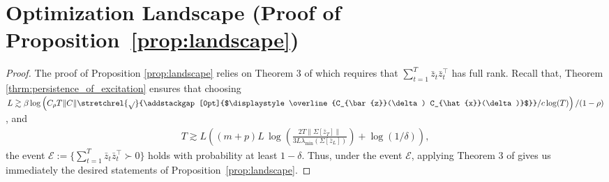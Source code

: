 \documentclass[11pt]{article}
\renewcommand{\cite}{\citep}
\newcommand{\zbar}{\bar{z}}
\newcommand{\xtil}{\hat{x}}
\newcommand{\norm}[1]{\|{#1} \|}
\newcommand{\normbig}[1]{\left\|{#1} \right\|}
\newcommand{\<}{\langle}
\renewcommand{\>}{\rangle}
\numberwithin{equation}{section}
\newcommand\mysqrt[2][0pt]{\stretchrel{\sqrt{}}{\addstackgap%
		[#1]{$\displaystyle\overline{#2}$}}}
\begin{document}
%


\section{Optimization Landscape (Proof of Proposition~\ref{prop:landscape})} \label{app:optim}

\begin{proof}%
    The proof of Proposition \ref{prop:landscape} relies on Theorem 3 of \cite{zhu2020global} which requires that $\sum_{t=1}^T \bar z_t \bar z_t^\top$ %
    has full rank. Recall that, Theorem \ref{thrm:persistence_of_excitation} ensures that choosing $L \gtrsim \beta\log\left(C_\rho T \norm{C}\mysqrt{C_{\zbar}(\delta) C_{\xtil}(\delta)}/c\log(T)\right)/(1-\rho)$, and 
    \begin{align*}
        T \gtrsim L \left((m+p)L \,\log\left(\frac{2T\normbig{\Sigma[\zbar_T]}}{3L \lambda_{\min}\left(\Sigma[\zbar_L]\right)}\right)  + \log(1/\delta)\right),
    \end{align*}
    the event $\mathcal{E} := \lbrace \sum_{t=1}^T \bar{z}_t \bar z_t ^\top \succ 0 \rbrace$ holds with probability at least $1-\delta$. 
    Thus, under the event $\mathcal{E}$, applying Theorem 3 of \cite{zhu2020global} gives us immediately the desired statements of Proposition~\ref{prop:landscape}.
\end{proof}


% 
\end{document}

